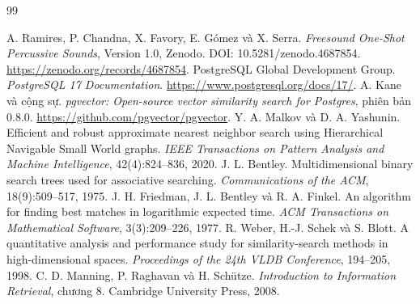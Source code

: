 \documentclass[11pt,a4paper]{article}
\begin{document}
\begin{thebibliography}{99}
 A. Ramires, P. Chandna, X. Favory, E. Gómez và X. Serra. \emph{Freesound One-Shot Percussive Sounds}, Version 1.0, Zenodo. DOI: 10.5281/zenodo.4687854. \url{https://zenodo.org/records/4687854}.
 PostgreSQL Global Development Group. \emph{PostgreSQL 17 Documentation}. \url{https://www.postgresql.org/docs/17/}.
 A. Kane và cộng sự. \emph{pgvector: Open-source vector similarity search for Postgres}, phiên bản 0.8.0. \url{https://github.com/pgvector/pgvector}.
 Y. A. Malkov và D. A. Yashunin. Efficient and robust approximate nearest neighbor search using Hierarchical Navigable Small World graphs. \emph{IEEE Transactions on Pattern Analysis and Machine Intelligence}, 42(4):824--836, 2020.
 J. L. Bentley. Multidimensional binary search trees used for associative searching. \emph{Communications of the ACM}, 18(9):509--517, 1975.
 J. H. Friedman, J. L. Bentley và R. A. Finkel. An algorithm for finding best matches in logarithmic expected time. \emph{ACM Transactions on Mathematical Software}, 3(3):209--226, 1977.
 R. Weber, H.-J. Schek và S. Blott. A quantitative analysis and performance study for similarity-search methods in high-dimensional spaces. \emph{Proceedings of the 24th VLDB Conference}, 194--205, 1998.
 C. D. Manning, P. Raghavan và H. Schütze. \emph{Introduction to Information Retrieval}, chương 8. Cambridge University Press, 2008.
\end{thebibliography}
\end{document}
